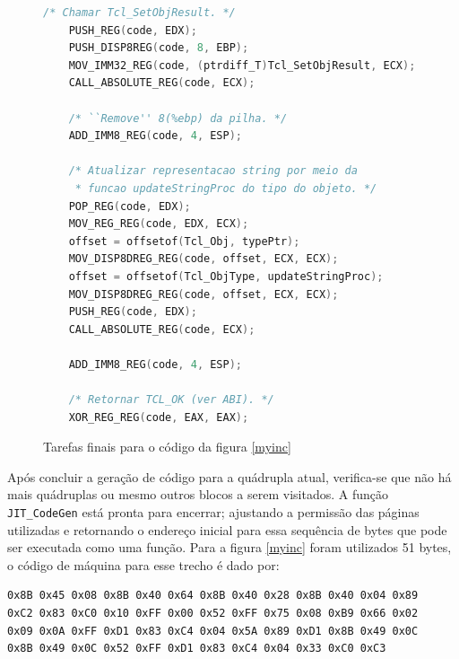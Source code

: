\begin{figure}[ht!]
  \centering
  \begin{lstlisting}[language=C]
    /* Chamar Tcl_SetObjResult. */
    PUSH_REG(code, EDX);
    PUSH_DISP8REG(code, 8, EBP);
    MOV_IMM32_REG(code, (ptrdiff_T)Tcl_SetObjResult, ECX);
    CALL_ABSOLUTE_REG(code, ECX);

    /* ``Remove'' 8(%ebp) da pilha. */
    ADD_IMM8_REG(code, 4, ESP);

    /* Atualizar representacao string por meio da
     * funcao updateStringProc do tipo do objeto. */
    POP_REG(code, EDX);
    MOV_REG_REG(code, EDX, ECX);
    offset = offsetof(Tcl_Obj, typePtr);
    MOV_DISP8DREG_REG(code, offset, ECX, ECX);
    offset = offsetof(Tcl_ObjType, updateStringProc);
    MOV_DISP8DREG_REG(code, offset, ECX, ECX);
    PUSH_REG(code, EDX);
    CALL_ABSOLUTE_REG(code, ECX);

    ADD_IMM8_REG(code, 4, ESP);

    /* Retornar TCL_OK (ver ABI). */
    XOR_REG_REG(code, EAX, EAX);
  \end{lstlisting}
  \caption{Tarefas finais para o código da figura \ref{myinc}\label{myinc-last}}
\end{figure}

Após concluir a geração de código para a quádrupla atual, verifica-se
que não há mais quádruplas ou mesmo outros blocos a serem visitados. A função
\verb!JIT_CodeGen! está pronta para encerrar; ajustando a permissão
das páginas utilizadas e retornando
o endereço inicial para essa sequência de bytes que pode ser executada
como uma função. Para a figura \ref{myinc} foram utilizados 51 bytes,
o código de máquina para esse trecho é dado por:
\begin{verbatim}
0x8B 0x45 0x08 0x8B 0x40 0x64 0x8B 0x40 0x28 0x8B 0x40 0x04 0x89
0xC2 0x83 0xC0 0x10 0xFF 0x00 0x52 0xFF 0x75 0x08 0xB9 0x66 0x02
0x09 0x0A 0xFF 0xD1 0x83 0xC4 0x04 0x5A 0x89 0xD1 0x8B 0x49 0x0C
0x8B 0x49 0x0C 0x52 0xFF 0xD1 0x83 0xC4 0x04 0x33 0xC0 0xC3
\end{verbatim}



